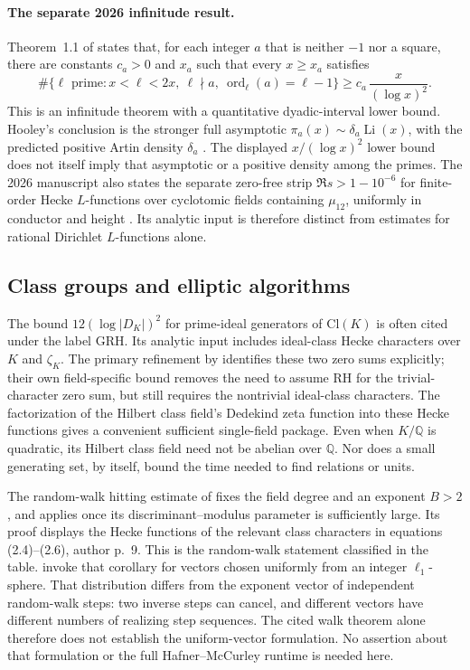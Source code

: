 \documentclass[11pt]{article}
\newcommand{\Q}{\mathbb Q}
\theoremstyle{definition}
\theoremstyle{remark}
\begin{document}
\paragraph{The separate 2026 infinitude result.}
Theorem~1.1 of \citet[p.~2]{OpenAIArtin2026} states that, for each
integer \(a\) that is neither \(-1\) nor a square, there are constants
\(c_a>0\) and \(x_a\) such that every \(x\geq x_a\) satisfies
\[
 \#\{\ell\text{ prime}:x<\ell<2x,\ \ell\nmid a,\
                    \operatorname{ord}_\ell(a)=\ell-1\}
 \geq c_a\,\frac{x}{(\log x)^2}.
\]
This is an infinitude theorem with a quantitative dyadic-interval
lower bound. Hooley's conclusion is the stronger full asymptotic
\(\pi_a(x)\sim\delta_a\operatorname{Li}(x)\), with the predicted
positive Artin density \(\delta_a\)
\citep[translation p.~47]{Hooley1967}.
The displayed \(x/(\log x)^2\) lower bound does not itself imply that
asymptotic or a positive density among the primes.
The 2026 manuscript also states the separate zero-free strip
\(\Re s>1-10^{-6}\) for finite-order Hecke \(L\)-functions over
cyclotomic fields containing \(\mu_{12}\), uniformly in conductor
and height \citep[Theorem~1.2, p.~3]{OpenAIArtin2026}.
Its analytic input is therefore distinct from estimates for rational
Dirichlet \(L\)-functions alone.

\subsection{Class groups and elliptic algorithms}

The bound $12(\log|D_K|)^2$ for prime-ideal generators of
$\mathrm{Cl}(K)$ is often cited under the label GRH. Its analytic input
includes ideal-class Hecke characters over $K$ and $\zeta_K$.
The primary refinement by \citet[author pp.~2--3]{BDF2008} identifies
these two zero sums explicitly; their own field-specific bound removes
the need to assume RH for the trivial-character zero sum, but still
requires the nontrivial ideal-class characters.
The factorization of the Hilbert class field's Dedekind zeta function
into these Hecke functions gives a convenient sufficient single-field
package. Even when $K/\Q$ is quadratic, its Hilbert class field need
not be abelian over $\Q$. Nor does a small generating set, by itself,
bound the time needed to find relations or units.

The random-walk hitting estimate of
\citet[Corollary~1.3, author p.~4; proof pp.~9--10]{JMV2009}
fixes the field degree and an exponent $B>2$, and applies once its
discriminant--modulus parameter is sufficiently large. Its proof displays
the Hecke functions of the relevant class characters in equations
(2.4)--(2.6), author p.~9. This is the random-walk statement classified
in the table.
\citet[Proposition~1, author pp.~8--9]{BiasseErukulangara2023}
invoke that corollary for vectors chosen uniformly from an integer
$\ell_1$-sphere. That distribution differs from the exponent vector of
independent random-walk steps: two inverse steps can cancel, and different
vectors have different numbers of realizing step sequences. The cited
walk theorem alone therefore does not establish the uniform-vector
formulation. No assertion about that formulation or the full
Hafner--McCurley runtime is needed here.
\end{document}
